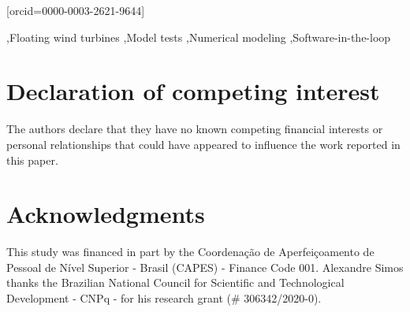 \documentclass[a4paper,fleqn]{cas-sc}
\begin{document}
\author[1]{Pedro C. de Mello}[orcid=0000-0003-2621-9644]





\begin{keywords}
    \sep Floating wind turbines \sep Model tests \sep Numerical modeling \sep Software-in-the-loop
\end{keywords}
  
\maketitle

\linenumbers







\printcredits

\section*{Declaration of competing interest}
The authors declare that they have no known competing financial interests or personal relationships that could have appeared to influence the work reported in this paper.

\section*{Acknowledgments}
This study was financed in part by the Coordenação de Aperfeiçoamento de Pessoal de Nível Superior - Brasil (CAPES) - Finance Code 001. Alexandre Simos thanks the Brazilian National Council for Scientific and Technological Development - CNPq - for his research grant (\# 306342/2020-0). 

%





%
\end{document}
